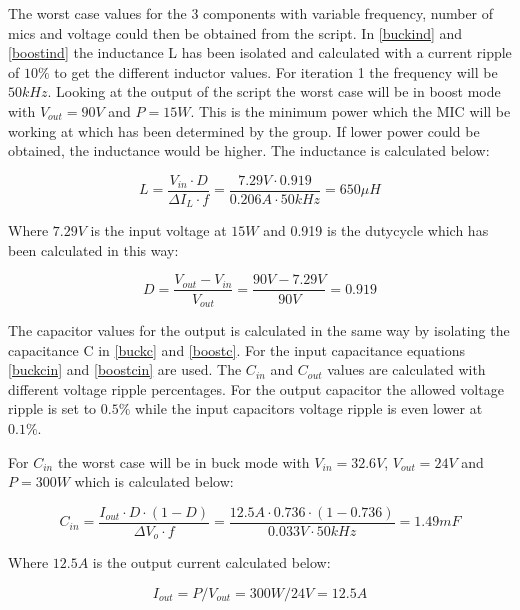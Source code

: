 The worst case values for the 3 components with variable frequency, number of mics and voltage could then be obtained from the script. 
In \ref{buckind} and \ref{boostind} the inductance L has been isolated and calculated with a current ripple of $10\%$ to get the different inductor values. For iteration 1 the frequency will be $50kHz$. Looking at the output of the script the worst case will be in boost mode with $V_{out}=90V$ and $P=15W$. This is the minimum power which the MIC will be working at which has been determined by the group. If lower power could be obtained, the inductance would be higher. The inductance is calculated below:

\begin{equation}\label{buckind}
L = \frac{V_{in}\cdot D}{\Delta I_L\cdot f}= \frac{7.29V\cdot 0.919}{0.206A\cdot 50kHz} = 650\mu H
\end{equation}

Where $7.29V$ is the input voltage at $15W$ and 0.919 is the dutycycle which has been calculated in this way:

\begin{equation} \label{boostD}
D = \frac{V_{out}-V_{in}}{V_{out}} = \frac{90V-7.29V}{90V} = 0.919
\end{equation} 

The capacitor values for the output is calculated in the same way by isolating the capacitance C in \ref{buckc} and \ref{boostc}. For the input capacitance equations \ref{buckcin} and \ref{boostcin} are used.
The $C_{in}$ and $C_{out}$ values are calculated with different voltage ripple percentages. For the output capacitor the allowed voltage ripple is set to $0.5\%$ while the input capacitors voltage ripple is even lower at $0.1\%$. 

For $C_{in}$ the worst case will be in buck mode with $V_{in}=32.6V$, $V_{out}=24V$ and $P=300W$ which is calculated below:

\begin{equation}
C_{in} = \frac{I_{out}\cdot D\cdot (1-D)}{\Delta V_o\cdot f} = \frac{12.5A\cdot 0.736\cdot (1-0.736)}{0.033V\cdot 50kHz} = 1.49mF
\end{equation}  

Where $12.5A$ is the output current calculated below:

\begin{equation}
I_{out} = P/V_{out} = 300W/24V = 12.5A
\end{equation}

